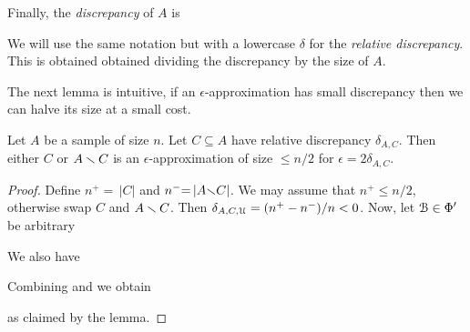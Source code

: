 \documentclass[sputnik.tex]{subfiles}
\begin{document}
Finally, the \emph{discrepancy\/} of $A$ is 


We will use the same notation but with a lowercase \emph{$\delta$\/} for the \emph{relative discrepancy}. This is obtained obtained dividing the discrepancy by the size of $A$.

The next lemma is intuitive, if an $\epsilon$-approximation has small discrepancy then we can halve its size at a small cost.

\begin{lemma}\label{lem_aprossimazionediapprossimazione}
Let $A$ be a sample of size $n$.
Let $C\subseteq A$ have relative discrepancy $\delta_{A,C}$.
Then either $C$ or $A\smallsetminus C$ is an $\epsilon$-approximation of size $\le n/2$ for $\epsilon=2\delta_{A,C}$.
\end{lemma}

\begin{proof}

Define $n^+{=}\,|C|$ and  $n^-{=}\,|A{\smallsetminus}C|$.
We may assume that $n^+\le n/2$, otherwise swap $C$ and $A\smallsetminus C$.
Then $\delta_{A,C,\EuScript U}=(n^+-n^-)/n<0$. Now, let $\EuScript B\in\Phi'$ be arbitrary




We also have 



Combining  and  we obtain\smallskip


\smallskip

as claimed by the lemma.
\end{proof}
\end{document}
